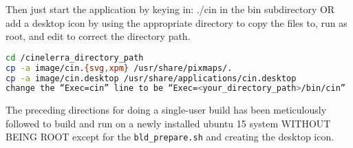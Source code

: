 Then just start the application by keying in: ./cin in the bin subdirectory OR add a desktop icon by
using the appropriate directory to copy the files to, run as root, and edit to correct the directory path.

\begin{lstlisting}[language=bash]
cd /cinelerra_directory_path
cp -a image/cin.{svg,xpm} /usr/share/pixmaps/.
cp -a image/cin.desktop /usr/share/applications/cin.desktop
change the “Exec=cin” line to be “Exec=<your_directory_path>/bin/cin”
\end{lstlisting}

The preceding directions for doing a single-user build has been meticulously followed to build and run
on a newly installed ubuntu 15 system WITHOUT BEING ROOT except for the \texttt{bld\_prepare.sh} and creating the desktop icon.
